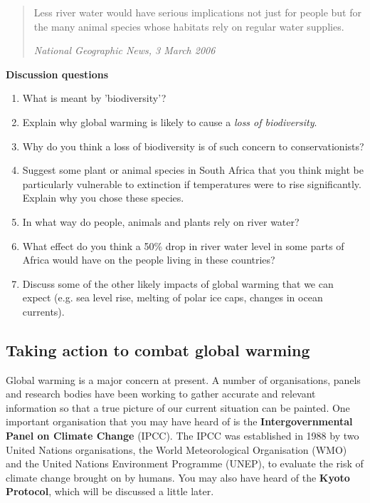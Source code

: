{\begin{quote}
Less river water would have serious implications not just for people but for the many animal species whose habitats rely on regular water supplies.

\textit{National Geographic News, 3 March 2006}
\end{quote}

\textbf{Discussion questions}

\begin{enumerate}
\item{What is meant by 'biodiversity'?}
\item{Explain why global warming is likely to cause a \textit{loss of biodiversity}.}
\item{Why do you think a loss of biodiversity is of such concern to conservationists?}
\item{Suggest some plant or animal species in South Africa that you think might be particularly vulnerable to extinction if temperatures were to rise significantly. Explain why you chose these species.}
\item{In what way do people, animals and plants rely on river water?}
\item{What effect do you think a 50\% drop in river water level in some parts of Africa would have on the people living in these countries?}
\item{Discuss some of the other likely impacts of global warming that we can expect (e.g. sea level rise, melting of polar ice caps, changes in ocean currents).}
\end{enumerate}
}

\subsection{Taking action to combat global warming}

Global warming is a major concern at present. A number of organisations, panels and research bodies have been working to gather accurate and relevant information so that a true picture of our current situation can be painted. One important organisation that you may have heard of is the \textbf{Intergovernmental Panel on Climate Change} (IPCC). The IPCC was established in 1988 by two United Nations organisations, the World Meteorological Organisation (WMO) and the United Nations Environment Programme (UNEP), to evaluate the risk of climate change brought on by humans. You may also have heard of the \textbf{Kyoto Protocol}, which will be discussed a little later.\\

